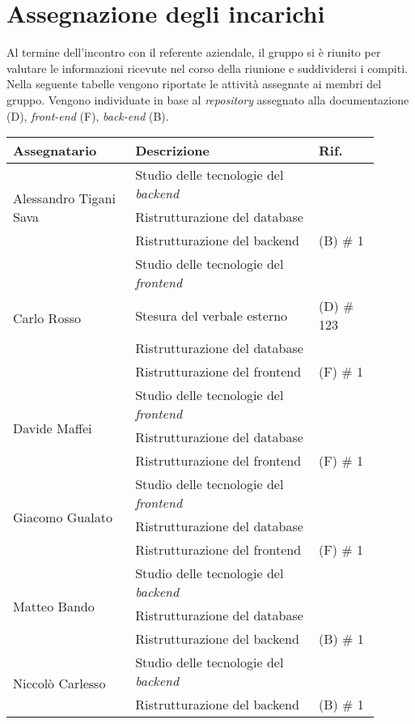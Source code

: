 \section{Assegnazione degli incarichi}
Al termine dell'incontro con il referente aziendale, il gruppo si è riunito per valutare le informazioni ricevute nel corso della riunione e suddividersi i compiti.\\
Nella seguente tabelle vengono riportate le attività assegnate ai membri del gruppo.
Vengono individuate in base al \textit{repository} assegnato alla documentazione (D), \textit{front-end} (F), \textit{back-end} (B).

\begin{center}
	{
		\renewcommand{\arraystretch}{1.5}
		\begin{tabular}{p{0.30\linewidth}|p{0.45\linewidth}|p{0.15\linewidth}}
			\textbf{Assegnatario}					& \textbf{Descrizione}										& \textbf{Rif.} \\
			\hline
			\multirow{3}{*}{Alessandro Tigani Sava}	& Studio delle tecnologie del \textit{backend}				& \\
			\cline{2-3}
													& Ristrutturazione del database								& \\
			\cline{2-3}
													& Ristrutturazione del backend								& (B) \# 1 \\
			\hline
			\multirow{4}{*}{Carlo Rosso}			& Studio delle tecnologie del \textit{frontend}				& \\
			\cline{2-3}
													& Stesura del verbale esterno								& (D) \# 123 \\
			\cline{2-3}
													& Ristrutturazione del database								& \\
			\cline{2-3}
													& Ristrutturazione del frontend								& (F) \# 1 \\
			\hline
			\multirow{3}{*}{Davide Maffei}			& Studio delle tecnologie del \textit{frontend}				& \\
			\cline{2-3}
													& Ristrutturazione del database								& \\
			\cline{2-3}
													& Ristrutturazione del frontend								& (F) \# 1 \\
			\hline
			\multirow{3}{*}{Giacomo Gualato}		& Studio delle tecnologie del \textit{frontend}				& \\
			\cline{2-3}
													& Ristrutturazione del database								& \\
			\cline{2-3}
													& Ristrutturazione del frontend								& (F) \# 1 \\
			\hline
			\multirow{3}{*}{Matteo Bando}			& Studio delle tecnologie del \textit{backend}				& \\
			\cline{2-3}
													& Ristrutturazione del database								& \\
			\cline{2-3}
													& Ristrutturazione del backend								& (B) \# 1 \\
			\hline
			\multirow{3}{*}{Niccolò Carlesso}		& Studio delle tecnologie del \textit{backend}				& \\
			\cline{2-3}
													& Ristrutturazione del backend								& (B) \# 1 \\
		\end{tabular}
	}
\end{center}
